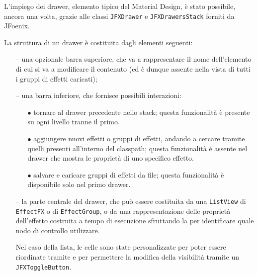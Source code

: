 
            L'impiego dei drawer, elemento tipico del Material Design, è stato possibile, ancora una volta, grazie alle classi \texttt{JFXDrawer} e \texttt{JFXDrawersStack} forniti da JFoenix.

            La struttura di un drawer è costituita dagli elementi seguenti:
            \begin{itemize}
                \item[--]
                    una opzionale barra superiore, che va a rappresentare il nome dell'elemento di cui si va a modificare il contenuto (ed è dunque assente nella vista di tutti i gruppi di effetti caricati);

                \item[--]
                    una barra inferiore, che fornisce possibili interazioni:
                    \begin{itemize}
                        \item[$\bullet$]
                            tornare al drawer precedente nello stack;
                            questa funzionalità è presente su ogni livello tranne il primo.
                        \item[$\bullet$]
                            aggiungere nuovi effetti o gruppi di effetti, andando a cercare tramite  quelli presenti all'interno del classpath;
                            questa funzionalità è assente nel drawer che mostra le proprietà di uno specifico effetto.
                        \item[$\bullet$]
                            salvare e caricare gruppi di effetti da file;
                            questa funzionalità è disponibile solo nel primo drawer.
                    \end{itemize}

                \item[--]
                    la parte centrale del drawer, che può essere costituita da una \texttt{ListView} di \texttt{EffectFX} o di \texttt{EffectGroup}, o da una rappresentazione delle proprietà dell'effetto costruita a tempo di esecuzione sfruttando la  per identificare quale nodo di controllo utilizzare.

                    Nel caso della lista, le celle sono state personalizzate per poter essere riordinate tramite  e per permettere la modifica della visibilità tramite un \texttt{JFXToggleButton}.%
            \end{itemize}

